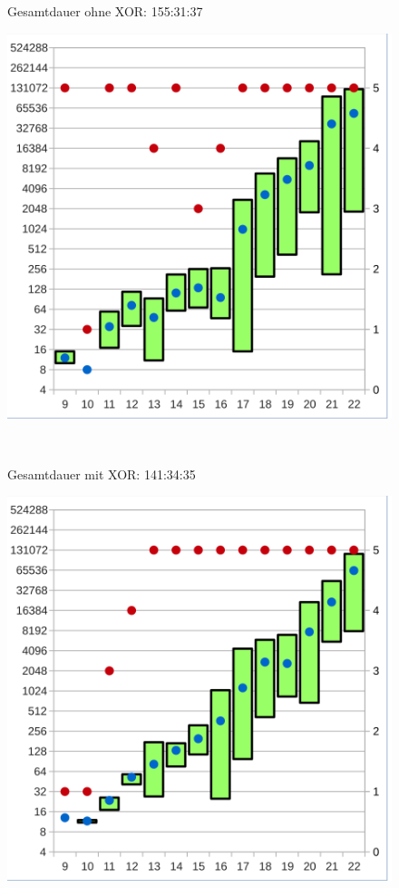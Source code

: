 \begin{figure}[!h]
  \centering
  \begin{minipage}[c]{0.45\textwidth}
  \begin{flushleft}Gesamtdauer ohne XOR: 155:31:37\end{flushleft}
  \includegraphics[scale=0.55]{images/data_dist_knf}
  \end{minipage}
  \begin{minipage}[c]{0.09\textwidth}
  ~~
  \end{minipage}
  \begin{minipage}[c]{0.45\textwidth}
  \begin{flushleft}Gesamtdauer mit XOR: 141:34:35\end{flushleft}
  \includegraphics[scale=0.55]{images/data_dist_xor}

\end{minipage}
\end{figure}
